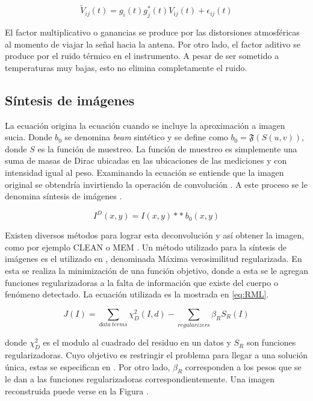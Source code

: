 \begin{equation}
    \tilde{V}_{ij}(t) = g_{i}(t)g^{*}_{j}(t)V_{ij}(t) + \epsilon_{ij}(t)
    \label{eq:error2}
\end{equation}

El factor multiplicativo o ganancias se produce por las distorsiones atmosféricas al momento de viajar la señal hacia la antena. Por otro lado, el factor aditivo se produce por el ruido térmico en el instrumento. A pesar de ser sometido a temperaturas muy bajas, esto no elimina completamente el ruido. 


\subsection{Síntesis de imágenes}
\label{subcap:sintesis}

La ecuación  origina la ecuación  cuando se incluye la aproximación a imagen sucia. Donde $b_{0}$ se denomina \textit{beam} sintético y se define como $b_0 = \mathfrak{F}(S(u, v))$, donde $S$ es la función de muestreo. La función de muestreo es simplemente una suma de masas de Dirac ubicadas en las ubicaciones de las mediciones y con intensidad igual al peso.  Examinando la ecuación  se entiende que la imagen original se obtendría invirtiendo la operación de convolución . A este proceso se le denomina síntesis de imágenes \citep{synthesis}.  

\begin{equation}
\label{eq:intensity_conv}
    I^{D}(x,y) = I(x,y) **\ b_{0}(x,y)
\end{equation}

Existen diversos métodos para lograr esta deconvolución y así obtener la imagen, como por ejemplo CLEAN \citep{clean} o MEM \citep{sutton2006optimal}. Un método utilizado para la síntesis de imágenes es el utilizado en \citet{Chael_2018}, denominada Máxima verosimilitud regularizada. En esta se realiza la minimización de una función objetivo, donde a esta se le agregan funciones regularizadoras a la falta de información que existe del cuerpo o fenómeno detectado. La ecuación utilizada es la mostrada en \ref{eq:RML}.

\begin{equation}
 \label{eq:RML}
    J(I) = \sum_{data\ terms}\chi_{D}^{2}(I,d) - \sum_{regularizers} \beta_{R}S_{R}(I)
\end{equation}

donde $\chi_{D}^{2}$ es el modulo al cuadrado del residuo en un datos y $S_{R}$ son funciones regularizadoras. Cuyo objetivo es restringir el problema para llegar a una solución única, estas se especifican en \citet{Chael_2018}. Por otro lado, $\beta_{R}$ corresponden a los pesos que se le dan a las funciones regularizadoras correspondientemente. Una imagen reconstruida puede verse en la Figura .

